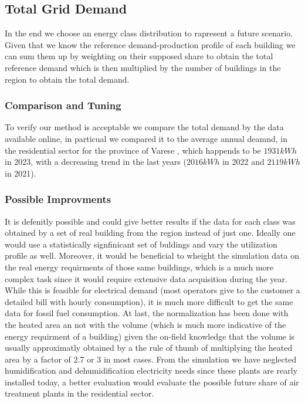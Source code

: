 
\subsection{Total Grid Demand}
In the end we choose an energy class distribution to rapresent a future scenario.
Given that we know the reference demand-production profile of each building we can sum them up by  weighting on their supposed share to obtain the total reference demand
which is then multiplied by the number of buildings in the region to obtain the total demand.


\subsubsection{Comparison and Tuning}
To verify our method is acceptable we compare the total demand by the data available online, in particual we compared it to the average annual deamnd,
in the residential sector for the province of Varese \cite{portaleconsumi_energia_domestica}, which happends to be $1931 kWh$ in 2023,
with a decreasing trend in the last years ($2016kWh$ in 2022 and $2119kWh$ in 2021). 


\subsubsection{Possible Improvments}
It is defenitly possible and could give better results if the data for each class was obtained by a set of real building from the region instead of just one.
Ideally one would use a statistically signfinicant set of buldings and vary the utilization profile as well.
Moreover, it would be beneficial to wheight the simulation data on the real energy requirments of those same buildings,
which is a much more complex task since it would require extensive data acquisition during the year. 
While this is feasible for electrical demand (most operators give to the customer a detailed bill with hourly consumption),
it is much more difficult to get the same data for fossil fuel consumption.
At last, the normalization has been done with the heated area an not with the volume (which is much more indicative of the energy requirment of a building) 
given the on-field knowledge that the volume is usually approximatly obtained by a the rule of thumb of multiplying the heated area by a factor of 2.7 or 3 in most cases.
From the simulation we have neglected humidification and dehumidification electricity needs since these plants are rearly installed today,
a better evaluation would evaluate the possible future share of air treatment plants in the residential sector.

